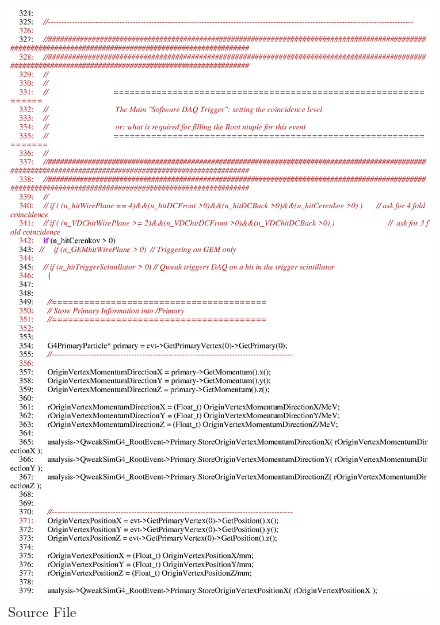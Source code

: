 \begin{figure}[h]
  \hspace{0cm}
  \includegraphics[scale=0.8]{./figures13/QweakSimEventAction.cc-p6.eps}
  \caption{\label{SourceXIII21} Source File}
           \label{fig:XIII-SC-21}
\end{figure}

\clearpage

